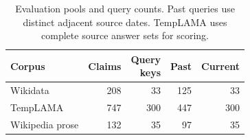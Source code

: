 \begin{table}[t]
\centering
\small
\begin{tabular}{lrrrr}
\toprule
Corpus & Claims & \shortstack{Query\\keys} & Past & Current \\
\midrule
Wikidata & 208 & 33 & 125 & 33 \\
TempLAMA & 747 & 300 & 447 & 300 \\
Wikipedia prose & 132 & 35 & 97 & 35 \\
\bottomrule
\end{tabular}
\caption{Evaluation pools and query counts. Past queries use distinct adjacent source dates. TempLAMA uses complete source answer sets for scoring.}
\label{tab:datasets}
\end{table}
